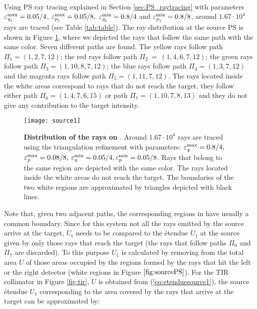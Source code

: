 \\ \indent
Using PS ray tracing explained in Section \ref{sec:PS_raytracing} with parameters $\varepsilon_{\textit{q}_1}^{\textrm{max}} = 0.05/4$, $ \varepsilon_{\textit{p}_1}^\textrm{max} = 0.05/8, $ $\varepsilon_{\textit{q}_1}^\textrm{min} = 0.8/4$ and $\varepsilon_{\textit{p}_1}^\textrm{min} = 0.8/8$, around $1.67 \cdot 10^4$ rays are traced (see Table \ref{tab:table}). The ray distribution at the source PS is shown in Figure \ref{fig:sourcePS}, where we depicted the rays that follow the same path with the same color. Seven different paths are found. The yellow rays follow path $\Pi_1 = (1, 2, 7, 12)$;
   the red rays follow path $\Pi_2 ~= ~(1, 4, 6, 7, 12)$; the green rays follow path $\Pi_3 = (1, 10, 8, 7, 12)$;
   the blue rays follow path $\Pi_4= (1, 3, 7, 12)$ and the magenta rays follow path $\Pi_5= (1, 11, 7, 12)$. The rays located inside the white areas correspond to rays that do not reach the target, they follow either path $\Pi_6 = (1, 4, 7, 6, 15)$ or path $\Pi_7 = (1,10,7,8,13)$ and they do not give any contribution to the target intensity.
\begin{figure}[t]
\label{fig:sourcePS}
  \begin{center}
  \texttt{[image: source1]}
  \end{center}
  \caption{\textbf{Distribution of the rays on }. Around $1.67 \cdot 10^4$ rays are traced using the triangulation refinement with parameters:
  $\varepsilon_{\textit{q}}^\textrm{max} = 0.8/4 ,$ $ \varepsilon_{\textit{p}}^\textrm{max} = 0.08/8, $ $\varepsilon_{\textit{q}}^\textrm{min} = 0.05/4, \varepsilon_{\textit{p}}^\textrm{min} = 0.05/8$. Rays that belong to the same region are depicted with the same color. The rays located inside the white areas do not reach the target. The boundaries of the two white regions are approximated by triangles depicted with black lines.}
 \label{fig:sourcePS}
\end{figure}
Note that, given two adjacent paths, the corresponding regions in  have usually a common boundary. 
Since for this system not all the rays emitted by the source arrive at the target, $U_{\textrm{t}}$ needs to be compared to the \'{e}tendue $U_1$ at the source given by only those rays that reach the target (the rays that follow paths $\Pi_6$ and 
$\Pi_7$ are discarded). To this purpose $U_1$ is calculated by removing from the total area $U$ of  those areas occupied by the regions formed by the rays that hit the left or the right detector (white regions in Figure $\ref{fig:sourcePS}$).  For the TIR collimator in Figure \ref{fig:tir}, $U$ is obtained from (\ref{eq:etenduesource1}), the source \'{e}tendue $U_1$ corresponding to the area covered by the rays that arrive at the target can be approximated by:

